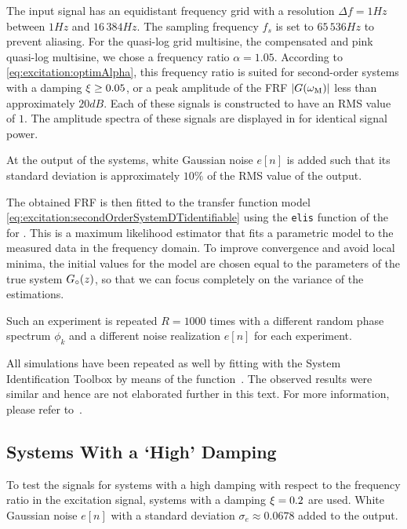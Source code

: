   The input signal has an equidistant frequency grid with a resolution $\Delta f = 1\unit{Hz}$ between $1 \unit{Hz}$ and $16\,384\unit{Hz}$.
  The sampling frequency $f_s$ is set to $65\,536\unit{Hz}$ to prevent aliasing.
  For the quasi-log grid multisine, the compensated and pink quasi-log multisine, we chose a frequency ratio $\alpha = 1.05$.
  According to \eqref{eq:excitation:optimAlpha}, this frequency ratio is suited for second-order systems with a damping $\xi_{} \geq 0.05$, or a peak amplitude of the \gls{FRF} $\left| G(\omega_{\mathrm{M}}) \right|$ less than approximately $20\unit{dB}$.
  Each of these signals is constructed to have an \gls{RMS} value of $1$.
  The amplitude spectra of these signals are displayed in  for identical signal power.

  At the output of the systems, white Gaussian noise $e[n]$ is added such that its standard deviation is approximately $10\%$ of the RMS value of the output.

  
  The obtained FRF is then fitted to the transfer function model \eqref{eq:excitation:secondOrderSystemDTidentifiable} using the \texttt{elis} function of the \FDIDENT~\citep{FDIDENT} for \MATLAB.
  This is a maximum likelihood estimator that fits a parametric model to the measured data in the frequency domain.
  To improve convergence and avoid local minima, the initial values for the model are chosen equal to the parameters of the true system $\true{G}(z)$, so that we can focus completely on the variance of the estimations.

  Such an experiment is repeated $R=1000$ times with a different random phase  spectrum $\phi_k$ and a different noise realization $e[n]$ for each experiment.

  \begin{remark}
  All simulations  have been repeated as well by fitting with the \MATLAB System Identification Toolbox by means of the  function~\citep{TDIDENT}.
  The observed results were similar and hence are not elaborated further in this text.
  For more information, please refer to~\citet{Larsson2012SYSID}.
  \end{remark}

  \subsection{Systems With a `High' Damping}
  To test the signals for systems with a high damping with respect to the frequency ratio in the excitation signal, systems with a damping $\xi_{} = 0.2$ are used.
  White Gaussian noise $e[n]$ with a standard deviation $\sigma_e \approx 0.0678$ added to the output.

